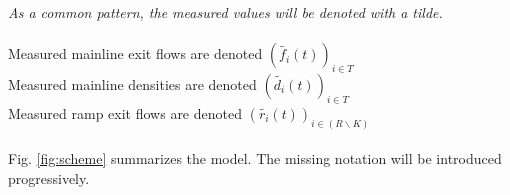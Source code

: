 \emph{As a common pattern, the measured values will be denoted with a tilde.}\\
\\
Measured mainline exit flows are denoted $(\widetilde{f_{i}}(t))_{i\in{T}}$\\
Measured mainline densities are denoted $(\widetilde{d_{i}}(t))_{i\in{T}}$\\
Measured ramp exit flows are denoted $(\widetilde{r_{i}}(t))_{i\in{(R\backslash K)}}$\\
\\
Fig.	 \ref{fig:scheme} summarizes the model. The missing notation will be introduced progressively. \\


